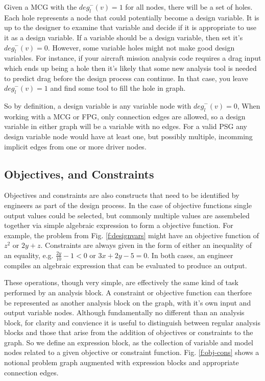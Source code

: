 Given a MCG with the ${deg}_l^-(v)=1$ for all nodes, there will be a set of holes. 
Each hole represents a node that could potentially become a design variable. 
It is up to the designer to examine that variable and decide if it is appropriate to 
use it as a design variable. If a variable should be a design variable, then 
set it's ${deg}_l^-(v)=0$. However, some variable holes might not make good design 
variables. For instance, if your aircraft mission analysis code requires a drag input 
which ends up being a hole then it's likely that some new analysis tool is needed
to predict drag before the design process can continue. In that case, you leave
${deg}_l^-(v)=1$ and find some tool to fill the hole in graph. 

So by definition, a design variable is any variable node with ${deg}_l^-(v)=0$, 
When working with a MCG or FPG, only connection edges are allowed, so a design 
variable in either graph will be a variable with no edges. For a valid PSG 
any design variable node would have at least one, but possibly multiple, incomming 
implicit edges from one or more driver nodes. 

\subsection{Objectives, and Constraints}
Objectives and constraints are also constructs that need to be identified by engineers 
as part of the design process. In the case of objective functions single output values 
could be selected, but commonly multiple values are assembeled together via simple 
algebraic expression to form a objective function. For example, the problem from 
Fig. \ref{f:designvars} might have an objective function of $z^2$ or $2y + z$. Constraints are 
always given in the form of either an inequality of an equality, e.g. 
$\frac{2y}{10}-1<0$ or $3x+2y - 5=0$. In both cases, an engineer compiles an
algebraic expression that can be evaluated to produce an output. 

These operations, though very simple, are effectively the same kind of task 
performed by an analysis block. A constraint or objective function can therfore 
be represented as another analysis block on the graph, with it's own input and 
output variable nodes. Although fundamentally no different than an analysis block, 
for clarity and convience it is useful to distinguish between regular analysis 
blocks and those that arise from the addition of objectives or constraints to 
the graph. So we define an expression block, as the collection of variable and model 
nodes related to a given objective or constraint function. Fig. \ref{f:obj-cons}
shows a notional problem graph augmented with expression blocks and appropriate 
connection edges. 


